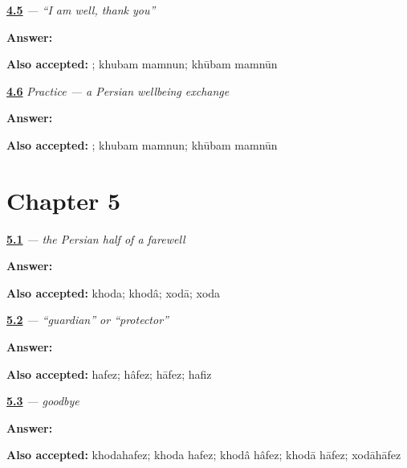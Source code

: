 \noindent\begin{minipage}[t]{\linewidth}
\raggedright
\hyperlink{review-FA-C04-khubam-reply}{\textbf{4.5}} \emph{  — “I am well, thank you”}\par
\small \textbf{Answer:}  \par
\footnotesize \textbf{Also accepted:}  ; khubam mamnun; khūbam mamnūn
\end{minipage}\par\medskip

\noindent\begin{minipage}[t]{\linewidth}
\raggedright
\hyperlink{review-FA-C04-practice-next-line}{\textbf{4.6}} \emph{Practice — a Persian wellbeing exchange}\par
\small \textbf{Answer:}  \par
\footnotesize \textbf{Also accepted:}  ; khubam mamnun; khūbam mamnūn
\end{minipage}\par\medskip

\section*{Chapter 5}

\noindent\begin{minipage}[t]{\linewidth}
\raggedright
\hyperlink{review-FA-C05-khoda-meaning}{\textbf{5.1}} \emph{ — the Persian half of a farewell}\par
\small \textbf{Answer:} \par
\footnotesize \textbf{Also accepted:} khoda; khodâ; xodā; xoda
\end{minipage}\par\medskip

\noindent\begin{minipage}[t]{\linewidth}
\raggedright
\hyperlink{review-FA-C05-hafez-meaning}{\textbf{5.2}} \emph{ — “guardian” or “protector”}\par
\small \textbf{Answer:} \par
\footnotesize \textbf{Also accepted:} hafez; hâfez; hāfez; hafiz
\end{minipage}\par\medskip

\noindent\begin{minipage}[t]{\linewidth}
\raggedright
\hyperlink{review-FA-C05-khodahafez-goodbye}{\textbf{5.3}} \emph{ — goodbye}\par
\small \textbf{Answer:} \par
\footnotesize \textbf{Also accepted:} khodahafez; khoda hafez; khodâ hâfez; khodā hāfez; xodāhāfez
\end{minipage}\par\medskip


